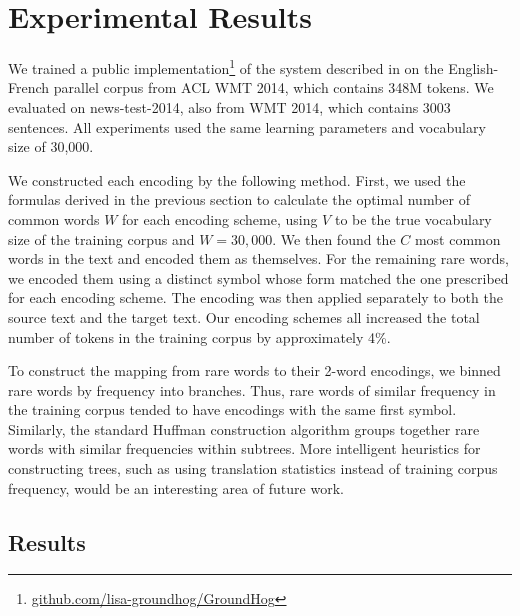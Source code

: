 \section{Experimental Results}
\label{sec:exp}

We trained a public
implementation\footnote{\url{github.com/lisa-groundhog/GroundHog}} of the
system described in  on the English-French
parallel corpus from ACL WMT 2014, which contains 348M tokens. We evaluated on
news-test-2014, also from WMT 2014, which contains 3003 sentences. All
experiments used the same learning parameters and vocabulary size of 30,000.

We constructed each encoding by the following method. First, we used the
formulas derived in the previous section to calculate the optimal number of
common words $W$ for each encoding scheme, using $V$ to be the true vocabulary
size of the training corpus and $W = 30,000$. We then found the $C$ most common
words in the text and encoded them as themselves. For the remaining rare words,
we encoded them using a distinct symbol whose form matched the one prescribed
for each encoding scheme. The encoding was then applied separately to both the
source text and the target text. Our encoding schemes all increased the total
number of tokens in the training corpus by approximately 4\%.

To construct the mapping from rare words to their 2-word encodings, we binned rare
words by frequency into branches. Thus, rare words of similar frequency in the
training corpus tended to have encodings with the same first symbol. Similarly,
the standard Huffman construction algorithm groups together rare words with
similar frequencies within subtrees. More intelligent heuristics for
constructing trees, such as using translation statistics instead of training
corpus frequency, would be an interesting area of future work.

\subsection{Results}

\begin{table}
  \centering
  \vspace{8pt}
  \caption{BLEU scores (\%) on detokenized test set for each encoding
    scheme after training for 5 days.}
  \label{table:results}
\end{table}


